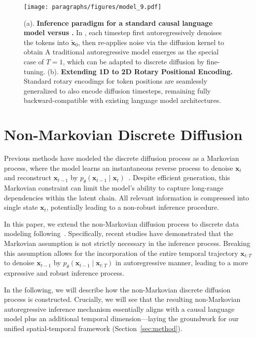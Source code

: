 \begin{figure*}[t]
    \centering
    \texttt{[image: paragraphs/figures/model\_9.pdf]}
    \caption{(a). \textbf{Inference paradigm for a standard causal language model versus \method{}.} In \method{}, each timestep first autoregressively denoises the tokens into $\widetilde{\mathbf{x}}_0$, then re-applies noise via the diffusion kernel to obtain A traditional autoregressive model emerges as the special case of $T=1$, which can be adapted to discrete diffusion by fine-tuning. (b). \textbf{Extending 1D to 2D Rotary Positional Encoding.} Standard rotary encodings for token positions are seamlessly generalized to also encode diffusion timesteps, remaining fully backward-compatible with existing language model architectures.}
    \label{fig:model}
\end{figure*}

\section{Non-Markovian Discrete Diffusion}
\label{sec:framework}

Previous methods have modeled the discrete diffusion process as a Markovian process, where the model learns an instantaneous reverse process to denoise \(\mathbf{x}_t\) and reconstruct \(\mathbf{x}_{t-1}\) by \(p_\theta (\mathbf{x}_{t-1} \mid \mathbf{x}_{t})\)~\citep{d3pm}. Despite efficient generation, this Markovian constraint can limit the model’s ability to capture long-range dependencies within the latent chain. All relevant information is compressed into single state \(\mathbf{x}_t\), potentially leading to a non-robust inference procedure.

In this paper, we extend the non-Markovian diffusion process to discrete data modeling following~\citep{DART}. Specifically, recent studies have demonstrated that the Markovian assumption is not strictly necessary in the inference process. Breaking this assumption allows for the incorporation of the entire temporal trajectory \(\mathbf{x}_{t:T}\) to denoise \(\mathbf{x}_{t-1}\) by \(p_\theta (\mathbf{x}_{t-1} \mid \mathbf{x}_{t:T})\) in autoregressive manner, leading to a more expressive and robust inference process. 

In the following, we will describe how the non-Markovian discrete diffusion process is constructed. Crucially, we will see that the resulting non-Markovian autoregressive inference mechanism essentially aligns with a causal language model plus an additional temporal dimension—laying the groundwork for our unified spatial-temporal framework (Section~\ref{sec:method}).



